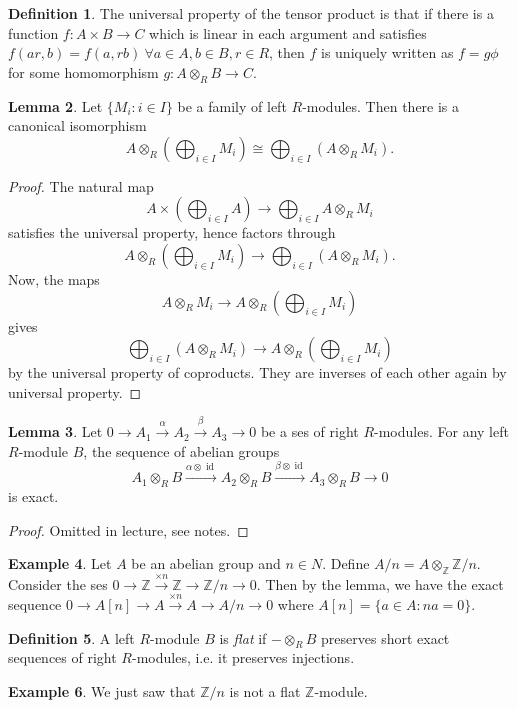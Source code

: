 \documentclass{article}
\newcommand{\Z}{\mathbb{Z}}
\newcommand{\id}{\operatorname{id}}
\theoremstyle{definition}
\newtheorem{defn}{Definition}[subsection]
\newtheorem{lemma}[defn]{Lemma}
\newtheorem{example}[defn]{Example}
\begin{document}
\begin{defn}
The universal property of the tensor product is that if there is a function $f:A\times B\rightarrow C$ which is linear in each argument and satisfies $f(ar,b)=f(a,rb) \ \forall a\in A,b\in B,r\in R$, then $f$ is uniquely written as $f=g\phi$ for some homomorphism $g:A\otimes_RB\rightarrow C$.
\end{defn}

\begin{lemma}
\label{lemma:tensproddistrib}
Let $\{M_i:i\in I\}$ be a family of left $R$-modules. Then there is a canonical isomorphism
\[
A\otimes_R \left(\bigoplus_{i\in I}M_i\right)\cong\bigoplus_{i\in I} \left(A\otimes_R M_i\right).
\]
\end{lemma}
\begin{proof}
The natural map
\[
A\times \left(\bigoplus_{i\in I}A\right)\rightarrow\bigoplus_{i\in I}A\otimes_RM_i
\]
satisfies the universal property, hence factors through
\[
A\otimes_R \left(\bigoplus_{i\in I}M_i\right)\rightarrow\bigoplus_{i\in I} \left(A\otimes_R M_i\right).
\]
Now, the maps
\[
A\otimes_RM_i\rightarrow A\otimes_R\left(\bigoplus_{i\in I}M_i\right)
\]
gives
\[
\bigoplus_{i\in I}\left(A\otimes_RM_i\right)\rightarrow A\otimes_R \left(\bigoplus_{i\in I}M_i\right)
\]
by the universal property of coproducts. They are inverses of each other again by universal property.
\end{proof}

\begin{lemma}
Let $0\rightarrow A_1\xrightarrow{\alpha}A_2\xrightarrow{\beta}A_3\rightarrow 0$ be a ses of right $R$-modules. For any left $R$-module $B$, the sequence of abelian groups
\[
A_1\otimes_R B\xrightarrow{\alpha\otimes\id} A_2\otimes_R B\xrightarrow{\beta\otimes\id} A_3\otimes_R B\rightarrow 0
\]
is exact.
\end{lemma}
\begin{proof}
Omitted in lecture, see notes.
\end{proof}

\begin{example}
Let $A$ be an abelian group and $n\in N$. Define $A/n=A\otimes_\Z\Z/n$. Consider the ses $0\rightarrow\Z\xrightarrow{\times n}\Z\rightarrow\Z/n\rightarrow 0$. Then by the lemma, we have the exact sequence $0\rightarrow A[n]\rightarrow A\xrightarrow{\times n}A\rightarrow A/n\rightarrow 0$ where $A[n]=\{a\in A:na=0\}$.
\end{example}

\begin{defn}
A left $R$-module $B$ is \textit{flat} if $-\otimes_RB$ preserves short exact sequences of right $R$-modules, i.e. it preserves injections.
\end{defn}
\begin{example}
We just saw that $\Z/n$ is not a flat $\Z$-module.
\end{example}
\end{document}
